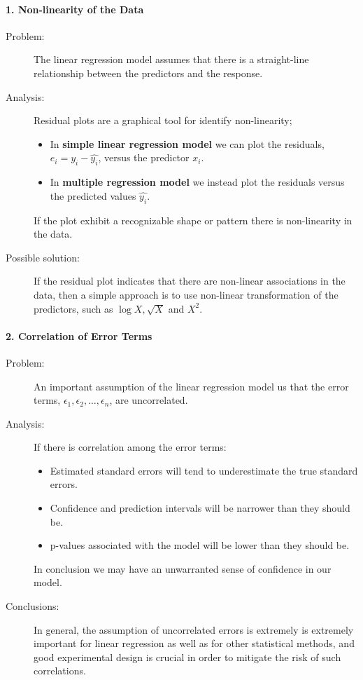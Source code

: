 \documentclass[a4paper]{article}
\begin{document}
						\paragraph{1. Non-linearity of the Data}
						\begin{description}
							\item[Problem:] The linear regression model assumes that there is a straight-line relationship between the predictors and the response.
							
							\item[Analysis:] Residual plots are a graphical tool for identify non-linearity;
								\begin{itemize}
									\item In \textbf{simple linear regression model} we can plot the residuals, $e_i = y_i - \hat{y_i}$, versus the predictor $x_i$.
									\item In \textbf{multiple regression model} we instead plot the residuals versus the predicted values $\hat{y_i}$.
								\end{itemize}
							If the plot exhibit a recognizable shape or pattern there is non-linearity in the data.
									
							\item[Possible solution:] If the residual plot indicates that there are non-linear associations in the data, then a simple approach is to use non-linear transformation of the predictors, such as $\log X, \sqrt{X}$ and $X^2$.
						\end{description}
						
						
						\paragraph{2. Correlation of Error Terms}
						\begin{description}
							\item[Problem:]	An important assumption of the linear regression model us that the error terms, $\epsilon_1, \epsilon_2, \dots, \epsilon_n$, are uncorrelated.
							
							\item[Analysis:] If there is correlation among the error terms:
							\begin{itemize}
								\item Estimated standard errors will tend to underestimate the true standard errors. 
								\item Confidence and prediction intervals will be narrower than they should be.
								\item p-values associated with the model will be lower than they should be.
							\end{itemize}
							In conclusion we may have an unwarranted sense of confidence in our model.
							
							\item[Conclusions:] In general, the assumption of uncorrelated errors is extremely is extremely important for linear regression as well as for other statistical methods, and good experimental design is crucial in order to mitigate the risk of such correlations.		
						
						\end{description}
						
\end{document}
